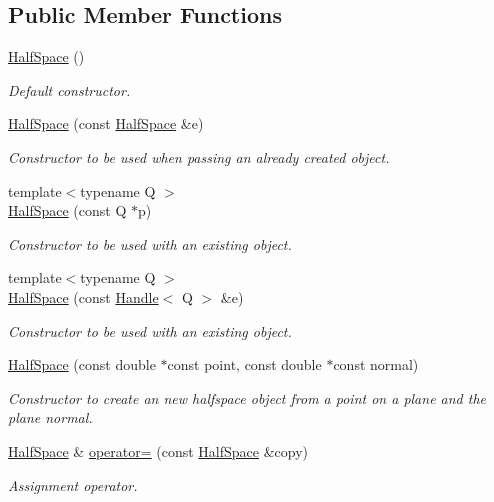 \subsection*{Public Member Functions}
\begin{DoxyCompactItemize}
\item 
\hyperlink{class_d_d4hep_1_1_geometry_1_1_half_space_a5f03b7cfc3c691169bfacced429135a1}{HalfSpace} ()
\begin{DoxyCompactList}\small\item\em Default constructor. \item\end{DoxyCompactList}\item 
\hyperlink{class_d_d4hep_1_1_geometry_1_1_half_space_a3d64ff92bd49078b1602609302bc57d3}{HalfSpace} (const \hyperlink{class_d_d4hep_1_1_geometry_1_1_half_space}{HalfSpace} \&e)
\begin{DoxyCompactList}\small\item\em Constructor to be used when passing an already created object. \item\end{DoxyCompactList}\item 
{\footnotesize template$<$typename Q $>$ }\\\hyperlink{class_d_d4hep_1_1_geometry_1_1_half_space_acdea2ae740341bc458be29674de6df69}{HalfSpace} (const Q $\ast$p)
\begin{DoxyCompactList}\small\item\em Constructor to be used with an existing object. \item\end{DoxyCompactList}\item 
{\footnotesize template$<$typename Q $>$ }\\\hyperlink{class_d_d4hep_1_1_geometry_1_1_half_space_a9c7fac6e8ec3c628acfeb46e4acd9ba4}{HalfSpace} (const \hyperlink{class_d_d4hep_1_1_handle}{Handle}$<$ Q $>$ \&e)
\begin{DoxyCompactList}\small\item\em Constructor to be used with an existing object. \item\end{DoxyCompactList}\item 
\hyperlink{class_d_d4hep_1_1_geometry_1_1_half_space_adf737484b3071ad3fe7a41f24af83d4b}{HalfSpace} (const double $\ast$const point, const double $\ast$const normal)
\begin{DoxyCompactList}\small\item\em Constructor to create an new halfspace object from a point on a plane and the plane normal. \item\end{DoxyCompactList}\item 
\hyperlink{class_d_d4hep_1_1_geometry_1_1_half_space}{HalfSpace} \& \hyperlink{class_d_d4hep_1_1_geometry_1_1_half_space_ab1c882102bd5a1e615ca7283253a3f01}{operator=} (const \hyperlink{class_d_d4hep_1_1_geometry_1_1_half_space}{HalfSpace} \&copy)
\begin{DoxyCompactList}\small\item\em Assignment operator. \item\end{DoxyCompactList}\end{DoxyCompactItemize}

